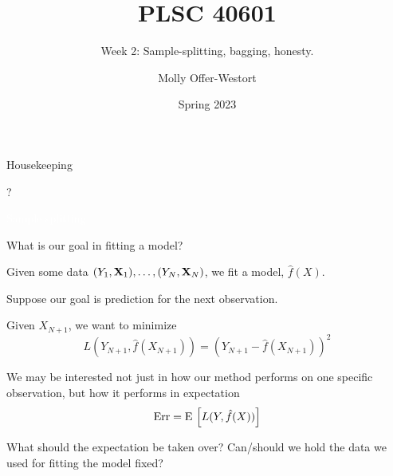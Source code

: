 \documentclass[xcolor={table}, handout]{beamer}
\title{PLSC 40601}
\subtitle{Week 2: Sample-splitting, bagging, honesty.}
\date{Spring 2023}
\author{Molly Offer-Westort}
\institute{Department of Political Science, \\University of Chicago}
\begin{document}


\frame{\titlepage
\thispagestyle{empty}
}
\begin{frame}{Housekeeping}

\begin{wideitemize}
\item ?
\end{wideitemize}

\end{frame}



\begin{transitionframe}
\centering

\LARGE \textcolor{white}{Sample splitting}

\end{transitionframe}
\begin{frame}{What is our goal in fitting a model?}

\pause
\begin{wideitemize}
\item Given some data $(Y_1, \mathbf{X}_1), \dots, (Y_N, \mathbf{X}_N)$, we fit a model, $\hat{f}(X)$.\pause
\item Suppose our goal is prediction for the next observation. \pause
\item Given $X_{N+1}$, we want to minimize
\[
L\left(Y_{N+1}, \hat{f}(X_{N+1})\right) = \left(Y_{N+1} - \hat{f}(X_{N+1})\right)^2
\]\pause
\item We may be interested not just in how our method performs on one specific observation, but how it performs in expectation
\[
\textrm{Err} = {\textrm E}\, \left[ L(Y, \hat{f}(X))\right]
\]\pause
\item What should the expectation be taken over? \pause Can/should we hold the data we used for fitting the model fixed?
\end{wideitemize}

\end{frame}
\end{document}

